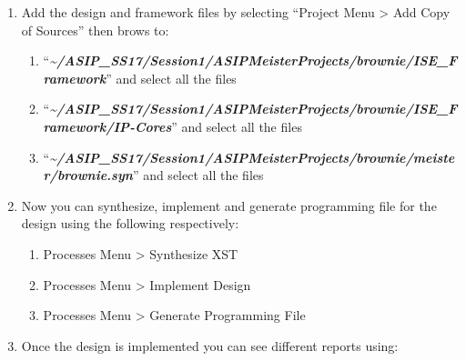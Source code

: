 \begin{enumerate}
	\item
	Add the design and framework files by selecting ``Project Menu
	\textgreater{} Add Copy of Sources'' then brows to:
	
	\begin{enumerate}
		\def\labelenumii{\alph{enumii}.}
		\item
		``\emph{\small{\textbf{\textasciitilde/ASIP\_SS17/Session1/ASIPMeisterProjects/brownie/ISE\_Framework}}}'' and select all the files
		\item
		``\emph{\small{\textbf{\textasciitilde/ASIP\_SS17/Session1/ASIPMeisterProjects/brownie/ISE\_Framework/IP-Cores}}}'' and select all the files
		\item
		``\emph{\small{\textbf{\textasciitilde/ASIP\_SS17/Session1/ASIPMeisterProjects/brownie/meister/brownie.syn}}}'' and select all the files
	\end{enumerate}
	\item
	Now you can synthesize, implement and generate programming file for
	the design using the following respectively:
	
	\begin{enumerate}
		\def\labelenumii{\alph{enumii}.}
		\item
		Processes Menu \textgreater{} Synthesize XST
		\item
		Processes Menu \textgreater{} Implement Design
		\item
		Processes Menu \textgreater{} Generate Programming File
	\end{enumerate}
	\item
	Once the design is implemented you can see different reports using:
	

\end{enumerate}
